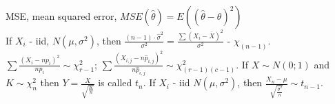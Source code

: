 MSE, mean squared error,
$MSE(\hat{\theta})=E((\hat{\theta}-\theta)^{2})$ \\


If $X_{i}$ - iid, $N(\mu,\sigma^{2})$, then
$\frac{(n-1)\cdot\hat{\sigma}^{2}}{\sigma^{2}}=
\frac{\sum (X_{i}-\overline{X})^{2}}{\sigma^{2}}$ - $\chi_{(n-1)}$. \\

$\sum \frac{(X_{i}-n p_{i})^{2}}{n p_{i}}\sim \chi_{r-1}^{2}$;
$\sum \frac{(X_{i,j}-n \hat{p}_{i,j})^{2}}{n\hat{p}_{i,j}}\sim
\chi_{(r-1)(c-1)}^{2}$. If $X\sim N(0;1)$ and $K\sim \chi_{n}^{2}$
then $Y=\frac{X}{\sqrt{\frac{K}{n}}}$ is called $t_{n}$.  If
$X_{i}$ - iid $N(\mu,\sigma^2)$, then
$\frac{X_{n}-\mu}{\sqrt{\frac{\hat{\sigma}^2}{n}}}\sim t_{n-1}$. \\
